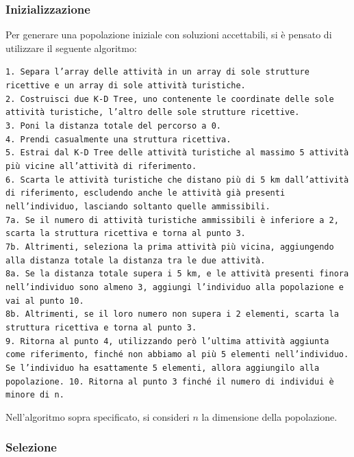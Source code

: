 \documentclass{CSUniSchoolLabReport}
\begin{document}
\pagebreak{}

\subsubsection{Inizializzazione}

Per generare una popolazione iniziale con soluzioni accettabili, si è pensato di utilizzare il seguente algoritmo:

\texttt{1. Separa l'array delle attività in un array di sole strutture ricettive e un array di sole attività turistiche. \\
2. Costruisci due K-D Tree, uno contenente le coordinate delle sole attività turistiche, l'altro delle sole strutture ricettive. \\
3. Poni la distanza totale del percorso a 0. \\
4. Prendi casualmente una struttura ricettiva. \\
5. Estrai dal K-D Tree delle attività turistiche al massimo 5 attività più vicine all'attività di riferimento. \\
6. Scarta le attività turistiche che distano più di 5 km dall'attività di riferimento, escludendo anche le attività già presenti nell'individuo, lasciando soltanto quelle ammissibili. \\
7a. Se il numero di attività turistiche ammissibili è inferiore a 2, scarta la struttura ricettiva e torna al punto 3. \\
7b. Altrimenti, seleziona la prima attività più vicina, aggiungendo alla distanza totale la distanza tra le due attività. \\
8a. Se la distanza totale supera i 5 km, e le attività presenti finora nell'individuo sono almeno 3, aggiungi l'individuo alla popolazione e vai al punto 10. \\
8b. Altrimenti, se il loro numero non supera i 2 elementi, scarta la struttura ricettiva e torna al punto 3. \\
9. Ritorna al punto 4, utilizzando però l'ultima attività aggiunta come riferimento, finché non abbiamo al più 5 elementi nell'individuo. Se l'individuo ha esattamente 5 elementi, allora aggiungilo alla popolazione.
10. Ritorna al punto 3 finché il numero di individui è minore di n. 
}

Nell'algoritmo sopra specificato, si consideri $n$ la dimensione della popolazione.

\subsubsection{Selezione}
\end{document}
